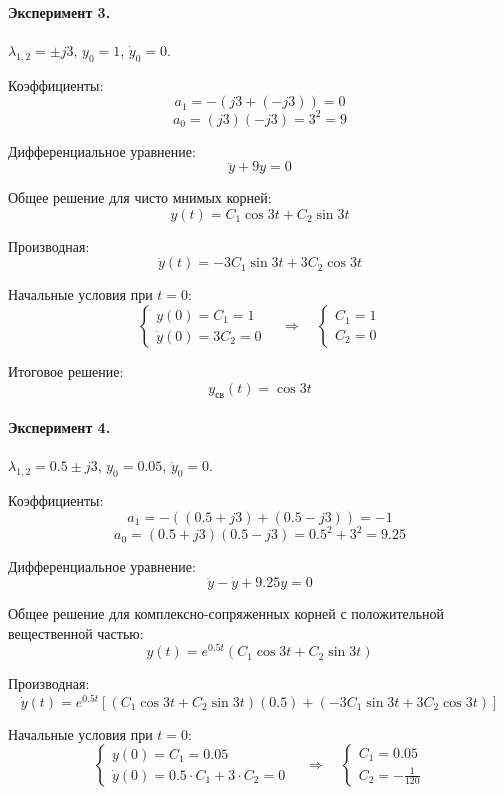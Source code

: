 \documentclass[14pt,a4paper]{extarticle}
\begin{document}
\paragraph{Эксперимент 3.} $\lambda_{1,2}=\pm j3$, $y_0=1$, $\dot y_0=0$.

Коэффициенты:
\[
  a_1 = -(j3 + (-j3)) = 0
\]
\[
  a_0 = (j3)(-j3) = 3^2 = 9
\]

Дифференциальное уравнение:
\begin{equation}
  \ddot y + 9y = 0
\end{equation}

Общее решение для чисто мнимых корней:
\[
  y(t) = C_1 \cos 3t + C_2 \sin 3t
\]

Производная:
\[
  \dot y(t) = -3C_1 \sin 3t + 3C_2 \cos 3t
\]

Начальные условия при $t = 0$:
\[
  \begin{cases}
    y(0) = C_1 = 1 \\
    \dot y(0) = 3C_2 = 0
  \end{cases}
  \quad\Rightarrow\quad
  \begin{cases}
    C_1 = 1 \\
    C_2 = 0
  \end{cases}
\]

Итоговое решение:
\begin{equation}
  y_{\text{св}}(t) = \cos 3t
\end{equation}


\paragraph{Эксперимент 4.} $\lambda_{1,2}=0.5\pm j3$, $y_0=0.05$, $\dot y_0=0$.

Коэффициенты:
\[
  a_1 = -((0.5 + j3) + (0.5 - j3)) = -1
\]
\[
  a_0 = (0.5 + j3)(0.5 - j3) = 0.5^2 + 3^2 = 9.25
\]

Дифференциальное уравнение:
\begin{equation}
  \ddot y - \dot y + 9.25y = 0
\end{equation}

Общее решение для комплексно-сопряженных корней с положительной вещественной частью:
\[
  y(t) = e^{0.5t}(C_1 \cos 3t + C_2 \sin 3t)
\]

Производная:
\[
  \dot y(t) = e^{0.5t}\left[(C_1 \cos 3t + C_2 \sin 3t)(0.5) + (-3C_1 \sin 3t + 3C_2 \cos 3t)\right]
\]

Начальные условия при $t = 0$:
\[
  \begin{cases}
    y(0) = C_1 = 0.05 \\
    \dot y(0) = 0.5 \cdot C_1 + 3 \cdot C_2 = 0
  \end{cases}
  \quad\Rightarrow\quad
  \begin{cases}
    C_1 = 0.05 \\
    C_2 = -\frac{1}{120}
  \end{cases}
\]
\end{document}
